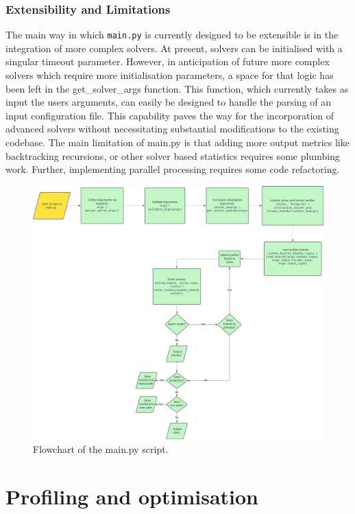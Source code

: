 \documentclass[11pt]{article}
\begin{document}
\subsubsection{Extensibility and Limitations}
The main way in which \texttt{main.py} is currently designed to be extensible is in the integration of more complex solvers. At present, solvers can be initialised with a singular timeout parameter. However, in anticipation of future more complex solvers which require more initialisation parameters, a space for that logic has been left in the get\_solver\_args function. This function, which currently takes as input the users arguments, can easily be designed to handle the parsing of an input configuration file. This capability paves the way for the incorporation of advanced solvers without necessitating substantial modifications to the existing codebase. 
The main limitation of main.py is that adding more output metrics like backtracking recursions, or other solver based statistics requires some plumbing work. Further, implementing parallel processing requires some code refactoring. 
\begin{figure}[H]
    \centering
    \includegraphics[width=1\textwidth]{figs/main_flowchart.png}
    \caption{Flowchart of the main.py script.}
    \label{fig:main_flowchart}
\end{figure}


\section{Profiling and optimisation}
\end{document}
